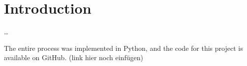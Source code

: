 \section{Introduction}

\dots

The entire process was implemented in Python, and the code for this project is available on GitHub. (link hier noch einfügen)